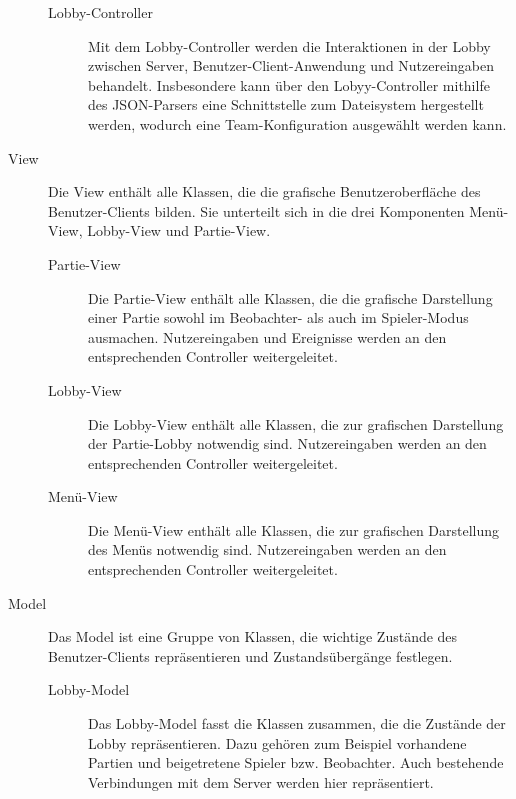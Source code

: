 \begin{description}
\begin{description}
            \item[Lobby-Controller]
            Mit dem Lobby-Controller werden die Interaktionen in der Lobby zwischen Server, Benutzer-Client-Anwendung und Nutzereingaben behandelt. Insbesondere kann über den Lobyy-Controller mithilfe des JSON-Parsers eine Schnittstelle zum Dateisystem hergestellt werden, wodurch eine Team-Konfiguration ausgewählt werden kann.
        \end{description}
        
        \item[View]
        Die View enthält alle Klassen, die die grafische Benutzeroberfläche des Benutzer-Clients bilden. Sie unterteilt sich in die drei Komponenten Menü-View, Lobby-View und Partie-View.
        \begin{description}
            \item[Partie-View]
            Die Partie-View enthält alle Klassen, die die grafische Darstellung einer Partie sowohl im Beobachter- als auch im Spieler-Modus ausmachen. Nutzereingaben und Ereignisse werden an den entsprechenden Controller weitergeleitet.
        
        
            \item[Lobby-View]
            Die Lobby-View enthält alle Klassen, die zur grafischen Darstellung der Partie-Lobby notwendig sind. Nutzereingaben werden an den entsprechenden Controller weitergeleitet.
        
        
            \item[Menü-View]
            Die Menü-View enthält alle Klassen, die zur grafischen Darstellung des Menüs notwendig sind. Nutzereingaben werden an den entsprechenden Controller weitergeleitet.

        \end{description}
        
        
        
        \item[Model]
        Das Model ist eine Gruppe von Klassen, die wichtige Zustände des Benutzer-Clients repräsentieren und Zustandsübergänge festlegen.
        
        \begin{description}
            \item[Lobby-Model]
            Das Lobby-Model fasst die Klassen zusammen, die die Zustände der Lobby repräsentieren. Dazu gehören zum Beispiel vorhandene Partien und beigetretene Spieler bzw. Beobachter. Auch bestehende Verbindungen mit dem Server werden hier repräsentiert.
        

\end{description}
\end{description}
